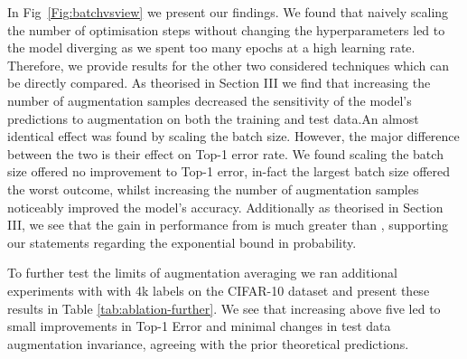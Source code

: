 \documentclass[journal]{IEEEtran}
\begin{document}
\begin{figure*}[t!]
    \center
      \hfill
      \hfill
      \hfill
    \caption{A comparison on the effect of increasing batch size versus increasing the number of augmentation samples on Top-1 error rate, test data augmentation invariance and training data augmentation invariance for the CIFAR-100 dataset. Increasing the amount of augmentation averaging decreased the error rate whilst also decreasing the sensitivity of the model's output predictions to augmented data. Increasing the batch size had a similar effect on the model's sensitivity, but it offered no improvement to model accuracy.}
    \label{Fig:batchvsview}
\end{figure*}



In Fig~\ref{Fig:batchvsview} we present our findings. We found that naively scaling the number of optimisation steps without changing the hyperparameters led to the model diverging as we spent too many epochs at a high learning rate. Therefore, we provide results for the other two considered techniques which can be directly compared. As theorised in Section III we find that increasing the number of augmentation samples decreased the sensitivity of the model's predictions to augmentation on both the training and test data.An almost identical effect was found by scaling the batch size. However, the major difference between the two is their effect on Top-1 error rate. We found scaling the batch size offered no improvement to Top-1 error, in-fact the largest batch size offered the worst outcome, whilst increasing the number of augmentation samples noticeably improved the model's accuracy. Additionally as theorised in Section III, we see that the gain in performance from  is much greater than , supporting our statements regarding the exponential bound in probability. 

To further test the limits of augmentation averaging we ran additional experiments with  with 4k labels on the CIFAR-10 dataset and present these results in Table \ref{tab:ablation-further}. We see that increasing  above five led to small improvements in Top-1 Error and minimal changes in test data augmentation invariance, agreeing with the prior theoretical predictions.
\end{document}

